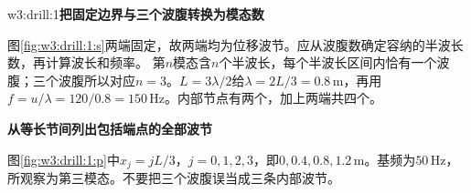 \LectureAnswerSection

\begin{drillsolution}{w3:drill:1}\textbf{把固定边界与三个波腹转换为模态数}\par\nobreak
图\ref{fig:w3:drill:1:s}两端固定，故两端均为位移波节。应从波腹数确定容纳的半波长数，再计算波长和频率。
第$n$模态含$n$个半波长，每个半波长区间内恰有一个波腹；三个波腹所以对应$n=3$。$L=3\lambda/2$给$\lambda=2L/3=0.8\,\mathrm m$，再用$f=u/\lambda=120/0.8=150\,\mathrm{Hz}$。内部节点有两个，加上两端共四个。



\par\medskip{}\noindent\textbf{从等长节间列出包括端点的全部波节}\par\nobreak
图\ref{fig:w3:drill:1:p}中$x_j=jL/3$，$j=0,1,2,3$，即$0,0.4,0.8,1.2\,\mathrm m$。基频为$50\,\mathrm{Hz}$，所观察为第三模态。不要把三个波腹误当成三条内部波节。\end{drillsolution}
